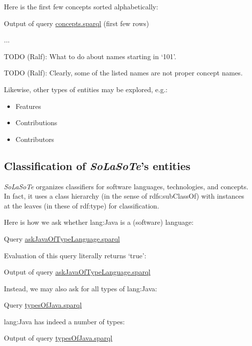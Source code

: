 \documentclass{article}
\newcommand{\uri}[1]{\textsf{#1}}
\newcommand{\todo}[2]{\noindent{}TODO (#1): #2}
\newcommand{\solasote}{{\itshape\textsf{SoLaSoTe}}}
\newcommand{\sparql}[1]{%
\medskip

\noindent
\begin{boxedminipage}{\hsize}
\hfill{}Query \underline{#1.sparql}

\end{boxedminipage}
\medskip
}
\newcommand{\partialOutput}[2]{%

\medskip

\noindent
\begin{boxedminipage}{\hsize}
\hfill{}Output of query \underline{#2.sparql} (first few rows)

{\large{}...}
\end{boxedminipage}
\medskip
}
\newcommand{\completeOutput}[1]{%

\medskip

\noindent
\begin{boxedminipage}{\hsize}
\hfill{}Output of query \underline{#1.sparql}

\end{boxedminipage}
\medskip
}
\begin{document}
\noindent
Here is the first few concepts sorted alphabetically:

\partialOutput{7}{concepts}

\todo{Ralf}{What to do about names starting in `101'.}

\todo{Ralf}{Clearly, some of the listed names are not proper concept names.}

Likewise, other types of entities may be explored, e.g.:

\begin{itemize}
\item Features
\item Contributions
\item Contributors
\end{itemize}


\subsection{Classification of \solasote's entities}

\solasote{} organizes classifiers for software languages,
technologies, and concepts. In fact, it uses a class hierarchy (in the
sense of rdfs:subClassOf) with instances at the leaves (in these of
rdf:type) for classification.

Here is how we ask whether \uri{lang:Java} is a (software) language:

\sparql{askJavaOfTypeLanguage}

\noindent
Evaluation of this query literally returns `true':

\completeOutput{askJavaOfTypeLanguage}

\noindent
Instead, we may also ask for all types of \uri{lang:Java}:

\sparql{typesOfJava}

\noindent
\uri{lang:Java} has indeed a number of types:

\completeOutput{typesOfJava}
\end{document}

